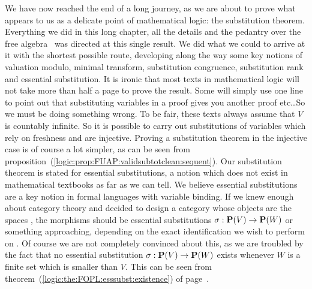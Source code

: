 We have now reached the end of a long journey, as we are about to
prove what appears to us as a delicate point of mathematical logic:
the substitution theorem. Everything we did in this long chapter,
all the details and the pedantry over the free algebra \pvs\ was
directed at this single result. We did what we could to arrive at it
with the shortest possible route, developing along the way some key
notions of valuation modulo, minimal transform, substitution
congruence, substitution rank and essential substitution. It is
ironic that most texts in mathematical logic will not take more than
half a page to prove the result. Some will simply use one line to
point out that substituting variables in a proof gives you another
proof etc\ldots So we must be doing something wrong. To be fair,
these texts always assume that $V$ is countably infinite. So it is
possible to carry out substitutions of variables which rely on
freshness and are injective. Proving a substitution theorem in the
injective case is of course a lot simpler, as can be seen from
proposition~(\ref{logic:prop:FUAP:validsubtotclean:sequent}). Our
substitution theorem is stated for essential substitutions, a notion
which does not exist in mathematical textbooks as far as we can
tell. We believe essential substitutions are a key notion in formal
languages with variable binding. If we knew enough about category
theory and decided to design a category whose objects are the spaces
\pv, the morphisms should be essential substitutions
$\sigma:\mbox{${\bf P}(V)$}\to{\bf P}(W)$ or something approaching, depending on the
exact identification we wish to perform on \pv. Of course we are not
completely convinced about this, as we are troubled by the fact that
no essential substitution $\sigma:\mbox{${\bf P}(V)$}\to{\bf P}(W)$ exists whenever
$W$ is a finite set which is smaller than $V$. This can be seen from
theorem~(\ref{logic:the:FOPL:esssubst:existence}) of
page~\pageref{logic:the:FOPL:esssubst:existence}.

